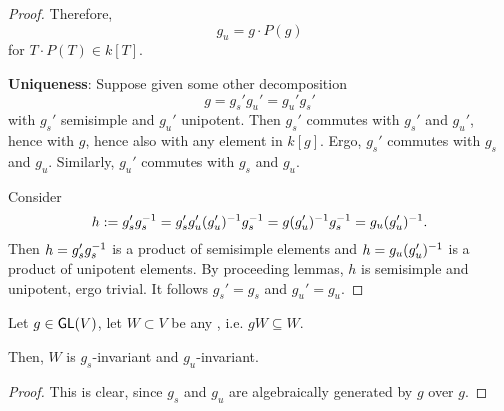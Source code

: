 \begin{proof}
Therefore,
\[ g_u = g \cdot P(g) \]
for $T \cdot P(T) \in k[T]$.


\textbf{Uniqueness}: Suppose given some other decomposition
\[ g = g_s'g_u' = g_u'g_s' \]
with $g_s'$ semisimple and $g_u'$ unipotent. Then $g_s'$ commutes with $g_s'$ and $g_u'$, hence with $g$, hence also with any element in $k[g]$.
Ergo, $g_s'$ commutes with $g_s$ and $g_u$. Similarly, $g_u'$ commutes with $g_s$ and $g_u$.

Consider 
\[ h := g_s' g_s^{-1} = g_s' g_u' (g_u')^{-1} g_s^{-1} = g (g_u')^{-1} g_s^{-1} = g_u (g_u')^{-1}. \]
Then $h = g_s' g_s^{-1}$ is a product of semisimple elements and $h = g_u (g_u')^{-1}$ is a product of unipotent elements. By proceeding lemmas, $h$ is semisimple and unipotent, ergo trivial. It follows $g_s' = g_s$ and $g_u' = g_u$.
\end{proof}

\begin{corollary}
Let $g \in \textsf{GL}(V)$, let $W \subset V$ be any , i.e. $gW \subseteq W$.

Then, $W$ is $g_s$-invariant and $g_u$-invariant.
\end{corollary}
\begin{proof}
This is clear, since $g_s$ and $g_u$ are algebraically generated by $g$ over $g$.
\end{proof}

